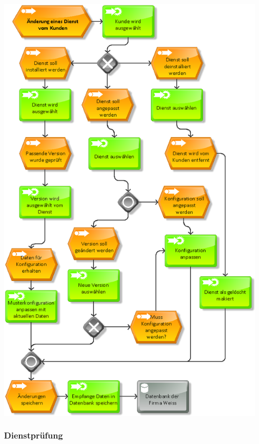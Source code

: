 \begin{center}
    \includegraphics[scale=0.45]{content/attachments/GP_Service_Cltr.png}
\end{center}


\subsubsection{Dienstprüfung}
\label{app.useCase_check}

